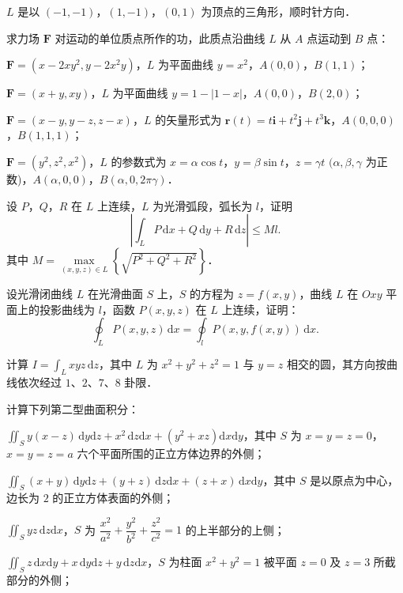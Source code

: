 \begin{xiti}
\begin{ziti}
\item $L$ 是以 $(-1,-1)$，$(1,-1)$，$(0,1)$ 为顶点的三角形，顺时针方向．
\end{ziti}
\item 求力场 $\bm{F}$ 对运动的单位质点所作的功，此质点沿曲线 $L$ 从 $A$ 点运动到 $B$ 点：
\begin{ziti}
\item $\bm{F}=\left(x-2xy^{2},y-2x^{2}y\right)$，$L$ 为平面曲线 $y=x^{2}$，$A(0,0)$，$B(1,1)$；
\item $\bm{F}=(x+y,xy)$，$L$ 为平面曲线 $y=1-\left|1-x\right|$，$A(0,0)$，$B(2,0)$；
\item $\bm{F}=(x-y,y-z,z-x)$，$L$ 的矢量形式为 $\bm{r}(t)=t\bm{i}+t^{2}\bm{j}+t^{3}\bm{k}$，$A(0,0,0)$，$B(1,1,1)$；
\item $\bm{F}=\left(y^{2},z^{2},x^{2}\right)$，$L$ 的参数式为 $x=\alpha\cos t$，$y=\beta\sin t$，$z=\gamma t$ $(\alpha,\beta,\gamma$ 为正数)，$A(\alpha,0,0)$，$B(\alpha,0,2\pi\gamma)$．
\end{ziti}
\item 设 $P$，$Q$，$R$ 在 $L$ 上连续，$L$ 为光滑弧段，弧长为 $l$，证明
\[
\left|\int_{L}P\,\mathrm{d}x+Q\,\mathrm{d}y+R\,\mathrm{d}z\right|\leqslant Ml.
\]
其中 $M=\max\limits_{(x,y,z)\in L}\left\{\sqrt{P^{2}+Q^{2}+R^{2}}\right\}$．
\item 设光滑闭曲线 $L$ 在光滑曲面 $S$ 上，$S$ 的方程为 $z=f(x,y)$，曲线 $L$ 在 $Oxy$ 平面上的投影曲线为 $l$，函数 $P(x,y,z)$ 在 $L$ 上连续，证明：
\[
\oint_{L}P(x,y,z)\,\mathrm{d}x=\oint_{l}P(x,y,f(x,y))\,\mathrm{d}x.
\]
\item 计算 $I=\displaystyle\int_{L}xyz\,\mathrm{d}z$，其中 $L$ 为 $x^{2}+y^{2}+z^{2}=1$ 与 $y=z$ 相交的圆，其方向按曲线依次经过 $1$、$2$、$7$、$8$ 卦限．
\item 计算下列第二型曲面积分：
\begin{ziti}
\item $\displaystyle\iint_{S}y(x-z)\,\mathrm{d}y\mathrm{d}z+x^{2}\,\mathrm{d}z\mathrm{d}x+\left(y^{2}+xz\right)\mathrm{d}x\mathrm{d}y$，其中 $S$ 为 $x=y=z=0$，$x=y=z=a$ 六个平面所围的正立方体边界的外侧；
\item $\displaystyle\iint_{S}(x+y)\,\mathrm{d}y\mathrm{d}z+(y+z)\,\mathrm{d}z\mathrm{d}x+(z+x)\,\mathrm{d}x\mathrm{d}y$，其中 $S$ 是以原点为中心，边长为 $2$ 的正立方体表面的外侧；
\item $\displaystyle\iint_{S}yz\,\mathrm{d}z\mathrm{d}x$，$S$ 为 $\dfrac{x^{2}}{a^{2}}+\dfrac{y^{2}}{b^{2}}+\dfrac{z^{2}}{c^{2}}=1$ 的上半部分的上侧；
\item $\displaystyle\iint_{S}z\,\mathrm{d}x\mathrm{d}y+x\,\mathrm{d}y\mathrm{d}z+y\,\mathrm{d}z\mathrm{d}x$，$S$ 为柱面 $x^{2}+y^{2}=1$ 被平面 $z=0$ 及 $z=3$ 所截部分的外侧；

\end{ziti}
\end{xiti}
